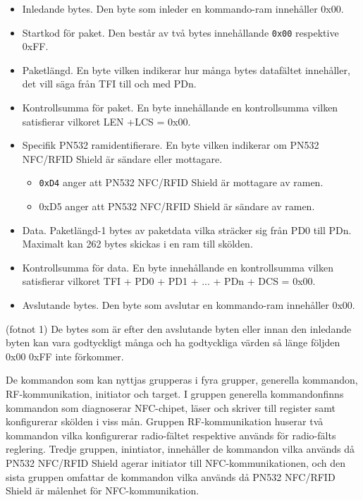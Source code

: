 \documentclass[11pt]{article}
\begin{document}
\begin{itemize}
\item Inledande bytes. Den byte som inleder en kommando-ram innehåller 0x00.
\item Startkod för paket. Den består av två bytes innehållande \texttt{0x00} respektive 0xFF.
\item Paketlängd. En byte vilken indikerar hur många bytes datafältet innehåller, det vill säga från TFI till och med PDn.
\item Kontrollsumma för paket. En byte innehållande en kontrollsumma vilken satisfierar vilkoret LEN +LCS = 0x00.
\item Specifik PN532 ramidentifierare. En byte vilken indikerar om PN532 NFC/RFID Shield är sändare eller mottagare.

\begin{itemize}
\item \texttt{0xD4} anger att PN532 NFC/RFID Shield är mottagare av ramen.
\item 0xD5 anger att PN532 NFC/RFID Shield är sändare av ramen.
\end{itemize}

\item Data. Paketlängd-1 bytes av paketdata vilka sträcker sig från PD0 till PDn. Maximalt kan 262 bytes skickas i en ram till skölden.
\item Kontrollsumma för data. En byte innehållande en kontrollsumma vilken satisfierar vilkoret TFI + PD0 + PD1 + ... + PDn + DCS = 0x00.
\item Avslutande bytes. Den byte som avslutar en kommando-ram innehåller 0x00.
\end{itemize}

(fotnot 1) De bytes som är efter den avslutande byten eller innan den inledande byten kan vara godtyckligt många och ha godtyckliga värden så länge följden 0x00 0xFF inte förkommer.

De kommandon som kan nyttjas grupperas i fyra grupper, generella kommandon, RF-kommunikation, initiator och target. I gruppen generella kommandonfinns kommandon som diagnoserar NFC-chipet, läser och skriver till register samt konfigurerar skölden i viss mån. Gruppen RF-kommunikation huserar två kommandon vilka konfigurerar radio-fältet respektive används för radio-fälts reglering. Tredje gruppen, inintiator, innehåller de kommandon vilka används då PN532 NFC/RFID Shield agerar initiator till NFC-kommunikationen, och den sista gruppen omfattar de kommandon vilka används då PN532 NFC/RFID Shield är målenhet för NFC-kommunikation.
\end{document}
